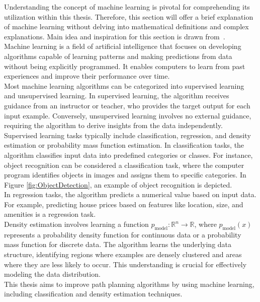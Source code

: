 \documentclass{ctuthesis}
\begin{document}
Understanding the concept of machine learning is pivotal for comprehending 
its utilization within this thesis. 
Therefore, this section will offer a brief explanation of machine learning without 
delving into mathematical definitions and complex explanations.
Main idea and inspiration for this section is drawn from~\cite{Goodfellow-et-al-2016DeepLearning}.\\[12pt]
Machine learning is a field of artificial intelligence that focuses on developing algorithms 
capable of learning patterns and making predictions from data without being explicitly programmed. 
It enables computers to learn from past experiences and improve their performance over time.\\[12pt]
Most machine learning algorithms can be categorized into supervised learning and unsupervised learning. 
In supervised learning, the algorithm receives guidance from an instructor or teacher, 
who provides the target output for each input example. 
Conversely, unsupervised learning involves no external guidance, 
requiring the algorithm to derive insights from the data independently.\\[12pt]
Supervised learning tasks typically include classification, regression, 
and density estimation or probability mass function estimation. 
In classification tasks, the algorithm classifies input data into predefined categories or classes. 
For instance, object recognition can be considered a classification task, 
where the computer program identifies objects in images and assigns them to specific categories.
In Figure \ref{fig:ObjectDetection}, an example of object recognition is depicted.\\[12pt]
In regression tasks, the algorithm predicts a numerical value based on input data. 
For example, predicting house prices based on features like location, 
size, and amenities is a regression task.\\[12pt]
Density estimation involves learning a function $p_{\text{model}}: \mathbb{R}^n \rightarrow \mathbb{R}$, 
where $p_{\text{model}}(x)$ represents a probability density function for continuous data or a probability mass function for discrete data. 
The algorithm learns the underlying data structure, 
identifying regions where examples are densely clustered and areas where they are less likely to occur. 
This understanding is crucial for effectively modeling the data distribution.\\[12pt]
This thesis aims to improve path planning algorithms by using machine learning, 
including classification and density estimation techniques.
\end{document}
